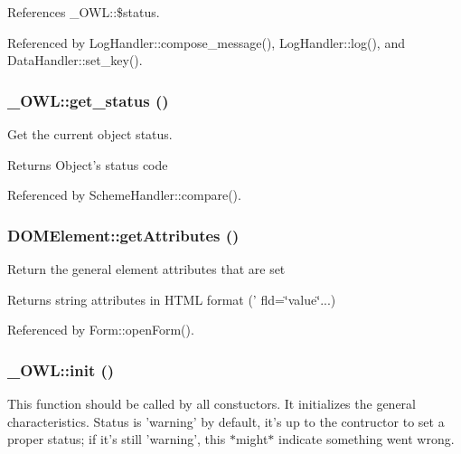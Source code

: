References \_\-OWL::\$status.



Referenced by LogHandler::compose\_\-message(), LogHandler::log(), and DataHandler::set\_\-key().

\subsubsection[{get\_\-status}]{\setlength{\rightskip}{0pt plus 5cm}\_\-OWL::get\_\-status ()}\label{class__OWL_a99ec771fa2c5c279f80152cc09e489a8}
Get the current object status.

\begin{DoxyReturn}{Returns}
Object's status code 
\end{DoxyReturn}


Referenced by SchemeHandler::compare().

\subsubsection[{getAttributes}]{\setlength{\rightskip}{0pt plus 5cm}DOMElement::getAttributes ()}\label{classDOMElement_a6c303bd7b18fdf485d05554b2f2191d9}
Return the general element attributes that are set \begin{DoxyReturn}{Returns}
string attributes in HTML format (' fld=\char`\"{}value\char`\"{}...) 
\end{DoxyReturn}


Referenced by Form::openForm().

\subsubsection[{init}]{\setlength{\rightskip}{0pt plus 5cm}\_\-OWL::init ()}\label{class__OWL_ae0ef3ded56e8a6b34b6461e5a721cd3e}
This function should be called by all constuctors. It initializes the general characteristics. Status is 'warning' by default, it's up to the contructor to set a proper status; if it's still 'warning', this $\ast$might$\ast$ indicate something went wrong. 


